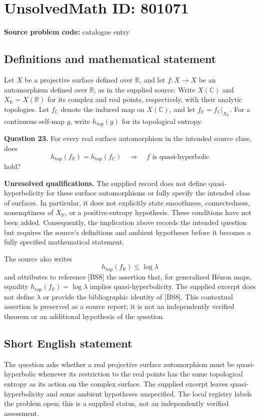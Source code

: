 \documentclass[11pt]{article}
\newcommand{\R}{\mathbb{R}}
\newcommand{\C}{\mathbb{C}}
\begin{document}
\section*{UnsolvedMath ID: 801071}
\textbf{Source problem code:} catalogue entry
\subsection{Definitions and mathematical statement}
Let \(X\) be a projective surface defined over \(\R\), and let \(f\colon X\to X\) be an automorphism defined over \(\R\), as in the supplied source. Write \(X(\C)\) and \(X_{\R}=X(\R)\) for its complex and real points, respectively, with their analytic topologies. Let \(f_{\C}\) denote the induced map on \(X(\C)\), and let \(f_{\R}=f_{\C}|_{X_{\R}}\). For a continuous self-map \(g\), write \(h_{\mathrm{top}}(g)\) for its topological entropy.

\textbf{Question 23.} For every real surface automorphism in the intended source class, does
\[
 h_{\mathrm{top}}(f_{\R})=h_{\mathrm{top}}(f_{\C})
 \quad\Longrightarrow\quad
 f\text{ is quasi-hyperbolic}
\]
hold?

\textbf{Unresolved qualifications.} The supplied record does not define quasi-hyperbolicity for these surface automorphisms or fully specify the intended class of surfaces. In particular, it does not explicitly state smoothness, connectedness, nonemptiness of \(X_{\R}\), or a positive-entropy hypothesis. These conditions have not been added. Consequently, the implication above records the intended question but requires the source's definitions and ambient hypotheses before it becomes a fully specified mathematical statement.

The source also writes
\[
 h_{\mathrm{top}}(f_{\R})\leq \log\lambda
\]
and attributes to reference [BS8] the assertion that, for generalized H\'enon maps, equality \(h_{\mathrm{top}}(f_{\R})=\log\lambda\) implies quasi-hyperbolicity. The supplied excerpt does not define \(\lambda\) or provide the bibliographic identity of [BS8]. This contextual assertion is preserved as a source report; it is not an independently verified theorem or an additional hypothesis of the question.
\subsection{Short English statement}
The question asks whether a real projective surface automorphism must be quasi-hyperbolic whenever its restriction to the real points has the same topological entropy as its action on the complex surface. The supplied excerpt leaves quasi-hyperbolicity and some ambient hypotheses unspecified. The local registry labels the problem open; this is a supplied status, not an independently verified assessment.
\end{document}
